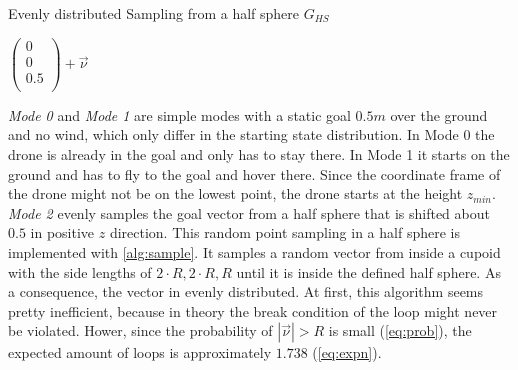 \newpage
\begin{algorithm}
	\caption{Evenly distributed Sampling from a half sphere $G_{HS}$}
	\label{alg:sample}
	
	
	\Return $ \left( \begin{array}{c}
		0 \\
		0 \\
		0.5\\
	\end{array}\right) + \overrightarrow{\nu}$
	
\end{algorithm}
\emph{Mode 0} and \emph{Mode 1} are simple modes with a static goal $0.5 m$ over the ground and no wind, which only differ in the starting state distribution. In Mode 0 the drone is already in the goal and only has to stay there. In Mode 1 it starts on the ground and has to fly to the goal and hover there. Since the coordinate frame of the drone might not be on the lowest point, the drone starts at the height $z_{min}$.\\
\emph{Mode 2} evenly samples the goal vector from a half sphere that is shifted about $0.5$ in positive $z$ direction. 
This random point sampling in a half sphere is implemented with \cref{alg:sample}. It samples a random vector from inside a cupoid with the side lengths of $2 \cdot R, 2 \cdot R, R$ until it is inside the defined half sphere. As a consequence, the vector in evenly distributed. At first, this algorithm seems pretty inefficient, because in theory the break condition of the loop might never be violated. Hower, since the probability of $|\overrightarrow{\nu}| > R$ is small (\cref{eq:prob}),
the expected amount of loops is approximately $1.738$ (\cref{eq:expn}).
